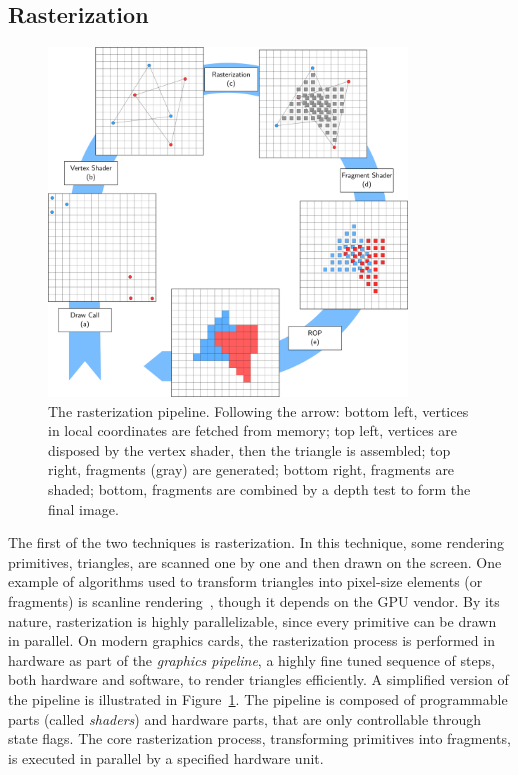 \subsection{Rasterization}

\begin{figure}
\centering
	 \includegraphics[width=0.85\textwidth]{figures/rasterization_pipeline.pdf} 
\caption{The rasterization pipeline. Following the arrow: bottom left, vertices in local coordinates are fetched from memory; top left, vertices are disposed by the vertex shader, then the triangle is assembled; top right, fragments (gray) are generated; bottom right, fragments are shaded; bottom, fragments are combined by a depth test to form the final image. } 
\label{fig:rasterpipeline}
\end{figure}

The first of the two techniques is rasterization. In this technique, some rendering primitives, triangles, are scanned one by one and then drawn on the screen. One example of algorithms used to transform triangles into pixel-size elements (or fragments) is scanline rendering~\cite{Wylie1967}, though it depends on the GPU vendor. By its nature, rasterization is highly parallelizable, since every primitive can be drawn in parallel. On modern graphics cards, the rasterization process is performed in hardware as part of the \emph{graphics pipeline}, a highly fine tuned sequence of steps, both hardware and software, to render triangles efficiently. A simplified version of the pipeline is illustrated in Figure~\ref{fig:rasterpipeline}. The pipeline is composed of programmable parts (called \emph{shaders}) and hardware parts, that are only controllable through state flags. The core rasterization process, transforming primitives into fragments, is executed in parallel by a specified hardware unit. 


